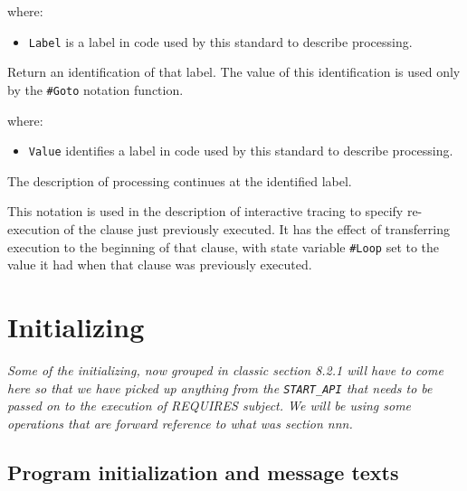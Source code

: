 

where:

\begin{itemize}
\tightlist
\item
  \texttt{Label} is a label in code used by this standard to describe
  processing.
\end{itemize}

Return an identification of that label. The value of this identification
is used only by the \texttt{\#Goto} notation function.



where:

\begin{itemize}
\tightlist
\item
  \texttt{Value} identifies a label in code used by this standard to
  describe processing.
\end{itemize}

The description of processing continues at the identified label.



This notation is used in the description of interactive tracing to
specify re-execution of the clause just previously executed. It has the
effect of transferring execution to the beginning of that clause, with
state variable \texttt{\#Loop} set to the value it had when that clause
was previously executed.

\section{Initializing}\label{initializing}

\emph{Some of the initializing, now grouped in classic section 8.2.1
will have to come here so that we have picked up anything from the
\texttt{START\_API} that needs to be passed on to the execution of
REQUIRES subject. We will be using some operations that are forward
reference to what was section nnn.}

\subsection{Program initialization and message
texts}\label{program-initialization-and-message-texts}

